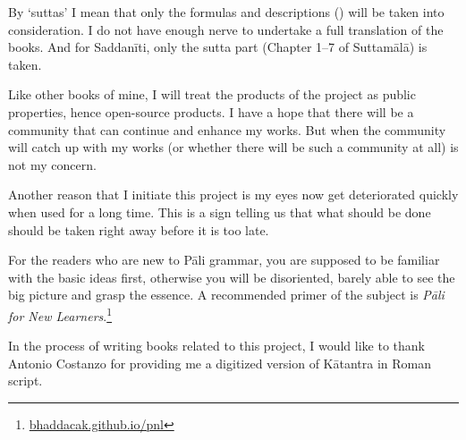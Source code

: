 By `suttas' I mean that only the formulas and descriptions () will be taken into consideration. I do not have enough nerve to undertake a full translation of the books. And for Saddanīti, only the sutta part (Chapter 1--7 of Suttamālā) is taken.

Like other books of mine, I will treat the products of the project as public properties, hence open-source products. I have a hope that there will be a community that can continue and enhance my works. But when the community will catch up with my works (or whether there will be such a community at all) is not my concern.

Another reason that I initiate this project is my eyes now get deteriorated quickly when used for a long time. This is a sign telling us that what should be done should be taken right away before it is too late.

For the readers who are new to Pāli grammar, you are supposed to be familiar with the basic ideas first, otherwise you will be disoriented, barely able to see the big picture and grasp the essence. A recommended primer of the subject is \emph{Pāli for New Learners}.\footnote{\url{bhaddacak.github.io/pnl}}

In the process of writing books related to this project, I would like to thank Antonio Costanzo for providing me a digitized version of Kātantra in Roman script.
